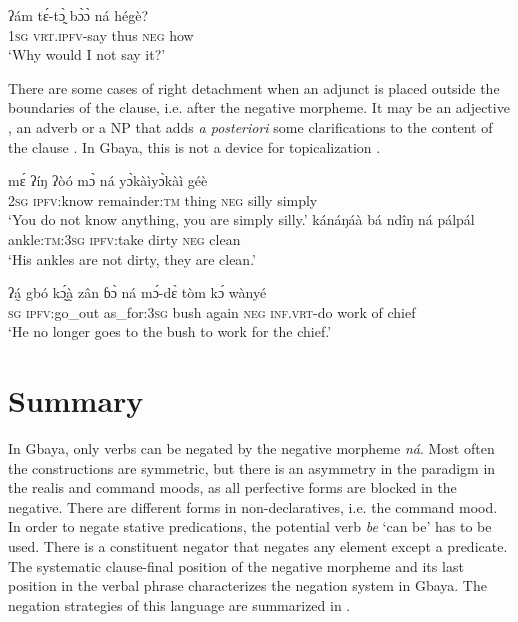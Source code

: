 \documentclass[output=paper,colorlinks=true, citecolor=brown]{langscibook}
\begin{document}
\ea\label{ex:gba:102}
    \gll ʔám tɛ́-tɔ̰̀ bɔ̀ɔ̀ ná hégè? \\ 
         1\textsc{sg} \textsc{vrt.ipfv}-say thus \textsc{neg} how \\
    \glt ‘Why would I not say it?’ 
\z 

There are some cases of right detachment when an adjunct is placed outside the boundaries of the clause, i.e. after the negative morpheme. It may be an adjective , an adverb  or a NP that adds \textit{a posteriori} some clarifications to the content of the clause . In Gbaya, this is not a device for topicalization \citep[120]{Creissels2006}.

\ea\label{ex:gba:103}
    \gll mɛ́ ʔíŋ ʔòó mɔ̀ ná yɔ̀kàìyɔ̀kàì géè \\ 
         2\textsc{sg} \textsc{ipfv}:know remainder:\textsc{tm} thing \textsc{neg} silly simply \\
    \glt ‘You do not know anything, you are simply silly.’
\z 
\ea\label{ex:gba:104}
    \gll kánáŋáà bá ndîŋ ná pálpál \\ 
         ankle:\textsc{tm}:3\textsc{sg} \textsc{ipfv}:take dirty \textsc{neg} clean \\
    \glt ‘His ankles are not dirty, they are clean.’ 
\z 

\ea\label{ex:gba:105}
    \gll ʔá̰  gbó kɔ̰́à̰  zân ɓɔ̀ ná mɔ́-dɛ̀ tòm kɔ́ wànyé \\ 
         \textsc{sg} \textsc{ipfv}:go\_out as\_for:3\textsc{sg} bush again \textsc{neg} \textsc{inf.vrt}-do work of chief \\
    \glt ‘He no longer goes to the bush to work for the chief.’
\z 

\section{Summary}\label{sec:gba:5}

In Gbaya, only verbs can be negated by the negative morpheme \textit{ná}. Most often the constructions are symmetric, but there is an asymmetry in the paradigm in the realis and command moods, as all perfective forms are blocked in the negative. There are different forms in non-declaratives, i.e. the command mood. In order to negate stative predications, the potential verb \textit{be} `can be' has to be used. There is a constituent negator that negates any element except a predicate. 
The systematic clause-final position of the negative morpheme and its last position in the verbal phrase characterizes the negation system in Gbaya. 
The negation strategies of this language are summarized in .
\end{document}
